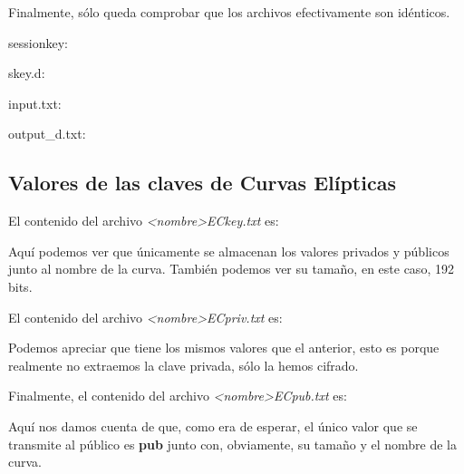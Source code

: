 \documentclass[a4paper, 11pt]{article}
\begin{document}
		Finalmente, sólo queda comprobar que los archivos efectivamente son idénticos.
		
		sessionkey:
		
		
		skey.d:
		
		
		input.txt:
		
		
		output\_d.txt:
		
	
	\subsection{Valores de las claves de Curvas Elípticas}
		El contenido del archivo \textit{<nombre>ECkey.txt} es:
		
		
		Aquí podemos ver que únicamente se almacenan los valores privados y públicos junto al nombre de la curva. También
		podemos ver su tamaño, en este caso, 192 bits.
		
		El contenido del archivo \textit{<nombre>ECpriv.txt} es:
		
		
		Podemos apreciar que tiene los mismos valores que el anterior, esto es porque realmente no extraemos la clave privada,
		sólo la hemos cifrado.
		
		Finalmente, el contenido del archivo \textit{<nombre>ECpub.txt} es:
		
		
		Aquí nos damos cuenta de que, como era de esperar, el único valor que se transmite al público es \textbf{pub} junto
		con, obviamente, su tamaño y el nombre de la curva.
			
		
\end{document}
